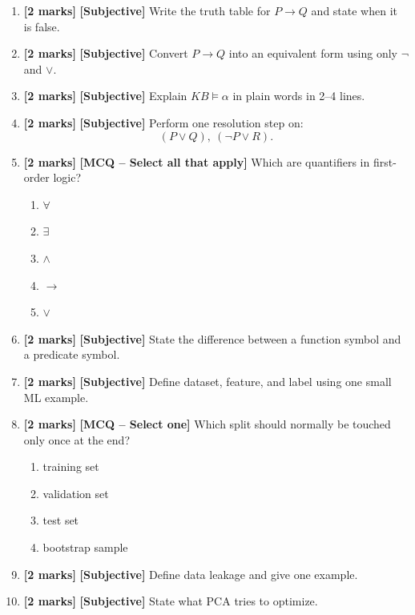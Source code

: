 \documentclass[11pt,a4paper]{article}
\newcommand{\EMarks}{\textbf{[2 marks]} }
\begin{document}
\begin{enumerate}[label=\textbf{E\arabic*.}, leftmargin=*]
  \item \EMarks \textbf{[Subjective]} Write the truth table for $P \rightarrow Q$ and state when it is false.

  \item \EMarks \textbf{[Subjective]} Convert $P \rightarrow Q$ into an equivalent form using only $\lnot$ and $\lor$.

  \item \EMarks \textbf{[Subjective]} Explain $KB \models \alpha$ in plain words in 2--4 lines.

  \item \EMarks \textbf{[Subjective]} Perform one resolution step on:
    \[
      (P \lor Q),\ (\lnot P \lor R).
    \]

  \item \EMarks \textbf{[MCQ -- Select all that apply]} Which are quantifiers in first-order logic?
    \begin{enumerate}[label=(\Alph*), leftmargin=*]
      \item $\forall$
      \item $\exists$
      \item $\land$
      \item $\rightarrow$
      \item $\lor$
    \end{enumerate}

  \item \EMarks \textbf{[Subjective]} State the difference between a function symbol and a predicate symbol.

  \item \EMarks \textbf{[Subjective]} Define dataset, feature, and label using one small ML example.

  \item \EMarks \textbf{[MCQ -- Select one]} Which split should normally be touched only once at the end?
    \begin{enumerate}[label=(\Alph*), leftmargin=*]
      \item training set
      \item validation set
      \item test set
      \item bootstrap sample
    \end{enumerate}

  \item \EMarks \textbf{[Subjective]} Define data leakage and give one example.

  \item \EMarks \textbf{[Subjective]} State what PCA tries to optimize.


\end{enumerate}
\end{document}
